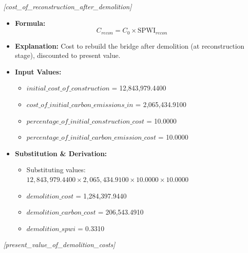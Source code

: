 \documentclass[12pt,a4paper]{article}
\begin{document}
\textit{[cost\_of\_reconstruction\_after\_demolition]}

\begin{itemize}
  \item \textbf{Formula:} $$C_{recon} = C_0 \times \text{SPWI}_{recon}$$
  \item \textbf{Explanation:} Cost to rebuild the bridge after demolition (at reconstruction stage), discounted to present value.
  \item \textbf{Input Values:}
  \begin{itemize}
    \item $initial\_cost\_of\_construction$ = 12,843,979.4400
    \item $cost\_of\_initial\_carbon\_emissions\_in$ = 2,065,434.9100
    \item $percentage\_of\_initial\_construction\_cost$ = 10.0000
    \item $percentage\_of\_initial\_carbon\_emission\_cost$ = 10.0000
  \end{itemize}
  \item \textbf{Substitution \& Derivation:}
  \begin{itemize}
    \item Substituting values: $12,843,979.4400 \times 2,065,434.9100 \times 10.0000 \times 10.0000$
    \item $demolition\_cost$ = 1,284,397.9440
    \item $demolition\_carbon\_cost$ = 206,543.4910
    \item $demolition\_spwi$ = 0.3310
  \end{itemize}
\end{itemize}


\textit{[present\_value\_of\_demolition\_costs]}
\end{document}
